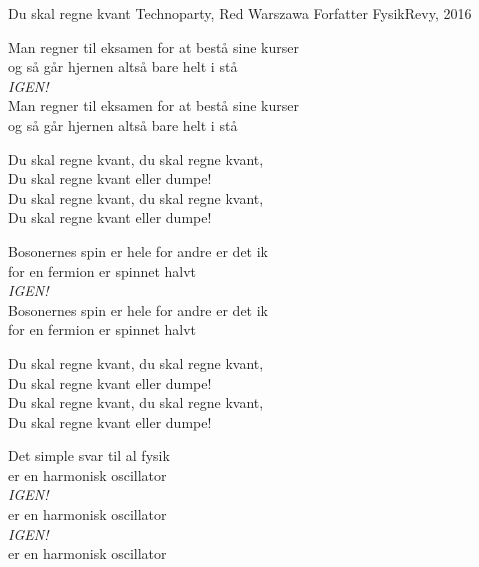 \begin{song}{Du skal regne kvant}
  {} %
  {Technoparty, Red Warszawa} %
  {Forfatter} %
  {FysikRevy, 2016} %
  {\NotCCLIed} %

  \begin{SBVerse}
    Man regner til eksamen for at bestå sine kurser\\
    og så går hjernen altså bare helt i stå\\
    \emph{IGEN!}\\
    Man regner til eksamen for at bestå sine kurser\\
    og så går hjernen altså bare helt i stå
  \end{SBVerse}

  \begin{SBChorus}
    Du skal regne kvant, du skal regne kvant,\\
    Du skal regne kvant eller dumpe!\\
    Du skal regne kvant, du skal regne kvant,\\
    Du skal regne kvant eller dumpe!
  \end{SBChorus}

  \begin{SBVerse}
    Bosonernes spin er hele for andre er det ik\\
    for en fermion er spinnet halvt\\
    \emph{IGEN!}\\
    Bosonernes spin er hele for andre er det ik\\
    for en fermion er spinnet halvt
  \end{SBVerse}

  \begin{SBChorus}
    Du skal regne kvant, du skal regne kvant,\\
    Du skal regne kvant eller dumpe!\\
    Du skal regne kvant, du skal regne kvant,\\
    Du skal regne kvant eller dumpe!
  \end{SBChorus}

  \begin{SBVerse}
    Det simple svar til al fysik\\
    er en harmonisk oscillator\\
    \emph{IGEN!}\\
    er en harmonisk oscillator\\
    \emph{IGEN!}\\
    er en harmonisk oscillator
  \end{SBVerse}


\end{song}
